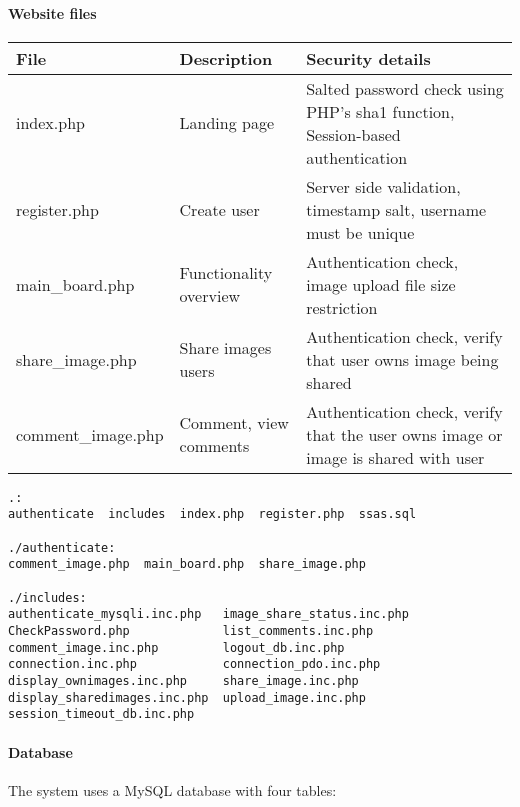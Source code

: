 \documentclass{article}
\begin{document}
\paragraph{Website files}
\begin{table}
\small
\begin{center}
\begin{tabularx}{\textwidth}{llX}
File & Description & Security details \\ \hline\hline
index.php & Landing page & Salted password check using PHP's sha1 function, Session-based authentication \\ \hline	
register.php & Create user & Server side validation, timestamp salt, username must be unique \\	\hline
main\_board.php & Functionality overview & Authentication check, image upload file size restriction \\ \hline	
share\_image.php & Share images users & Authentication check, verify that user owns image being shared \\ \hline 	
comment\_image.php & Comment, view comments & Authentication check, verify that the user owns image or image is shared with user \\ \hline	\hline
\end{tabularx}
\end{center}
\end{table}
\begin{verbatim}
.:
authenticate  includes  index.php  register.php  ssas.sql

./authenticate:
comment_image.php  main_board.php  share_image.php

./includes:
authenticate_mysqli.inc.php   image_share_status.inc.php
CheckPassword.php             list_comments.inc.php
comment_image.inc.php         logout_db.inc.php
connection.inc.php            connection_pdo.inc.php        
display_ownimages.inc.php     share_image.inc.php
display_sharedimages.inc.php  upload_image.inc.php
session_timeout_db.inc.php

\end{verbatim}

\paragraph{Database}
The system uses a MySQL database with four tables:
\end{document}
